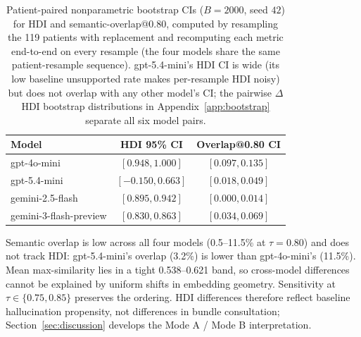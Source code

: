 \documentclass{article}
\theoremstyle{plain}
\begin{document}
\begin{table}[!t]
\centering
\small
\setlength{\tabcolsep}{4pt}
\begin{tabular}{lcc}
\toprule
\textbf{Model} & \textbf{HDI 95\% CI} & \textbf{Overlap@0.80 CI} \\
\midrule
gpt-4o-mini             & $[0.948, 1.000]$ & $[0.097, 0.135]$ \\
gpt-5.4-mini            & $[-0.150, 0.663]$ & $[0.018, 0.049]$ \\
gemini-2.5-flash        & $[0.895, 0.942]$ & $[0.000, 0.014]$ \\
gemini-3-flash-preview  & $[0.830, 0.863]$ & $[0.034, 0.069]$ \\
\bottomrule
\end{tabular}
\caption{Patient-paired nonparametric bootstrap CIs ($B{=}2000$, seed $42$) for HDI and semantic-overlap@0.80, computed by resampling the 119 patients with replacement and recomputing each metric end-to-end on every resample (the four models share the same patient-resample sequence). gpt-5.4-mini's HDI CI is wide (its low baseline unsupported rate makes per-resample HDI noisy) but does not overlap with any other model's CI; the pairwise $\Delta$HDI bootstrap distributions in Appendix~\ref{app:bootstrap} separate all six model pairs.}
\label{tab:cis}
\end{table} Semantic overlap is low across all four models (0.5--11.5\% at $\tau{=}0.80$) and does not track HDI: gpt-5.4-mini's overlap (3.2\%) is lower than gpt-4o-mini's (11.5\%). Mean max-similarity lies in a tight 0.538--0.621 band, so cross-model differences cannot be explained by uniform shifts in embedding geometry. Sensitivity at $\tau\in\{0.75, 0.85\}$ preserves the ordering. HDI differences therefore reflect baseline hallucination propensity, not differences in bundle consultation; Section~\ref{sec:discussion} develops the Mode A / Mode B interpretation.
\end{document}
